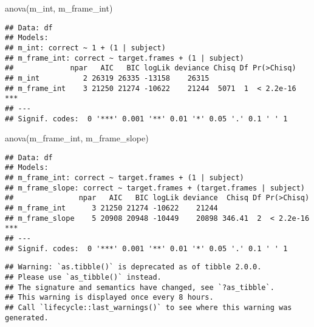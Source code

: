 \documentclass[
]{article}
\newenvironment{Shaded}{\begin{snugshade}}{\end{snugshade}}
\newcommand{\FunctionTok}[1]{\textcolor[rgb]{0.00,0.00,0.00}{#1}}
\newcommand{\NormalTok}[1]{#1}
\newcommand{\OtherTok}[1]{\textcolor[rgb]{0.56,0.35,0.01}{#1}}
\newcommand{\SpecialCharTok}[1]{\textcolor[rgb]{0.00,0.00,0.00}{#1}}
\newcommand{\StringTok}[1]{\textcolor[rgb]{0.31,0.60,0.02}{#1}}
\begin{document}
\begin{Shaded}
\begin{Highlighting}[]
\FunctionTok{anova}\NormalTok{(m\_int, m\_frame\_int)}
\end{Highlighting}
\end{Shaded}

\begin{verbatim}
## Data: df
## Models:
## m_int: correct ~ 1 + (1 | subject)
## m_frame_int: correct ~ target.frames + (1 | subject)
##             npar   AIC   BIC logLik deviance Chisq Df Pr(>Chisq)    
## m_int          2 26319 26335 -13158    26315                        
## m_frame_int    3 21250 21274 -10622    21244  5071  1  < 2.2e-16 ***
## ---
## Signif. codes:  0 '***' 0.001 '**' 0.01 '*' 0.05 '.' 0.1 ' ' 1
\end{verbatim}

\begin{Shaded}
\begin{Highlighting}[]
\FunctionTok{anova}\NormalTok{(m\_frame\_int, m\_frame\_slope)}
\end{Highlighting}
\end{Shaded}

\begin{verbatim}
## Data: df
## Models:
## m_frame_int: correct ~ target.frames + (1 | subject)
## m_frame_slope: correct ~ target.frames + (target.frames | subject)
##               npar   AIC   BIC logLik deviance  Chisq Df Pr(>Chisq)    
## m_frame_int      3 21250 21274 -10622    21244                         
## m_frame_slope    5 20908 20948 -10449    20898 346.41  2  < 2.2e-16 ***
## ---
## Signif. codes:  0 '***' 0.001 '**' 0.01 '*' 0.05 '.' 0.1 ' ' 1
\end{verbatim}

\begin{Shaded}
\end{Shaded}

\begin{verbatim}
## Warning: `as.tibble()` is deprecated as of tibble 2.0.0.
## Please use `as_tibble()` instead.
## The signature and semantics have changed, see `?as_tibble`.
## This warning is displayed once every 8 hours.
## Call `lifecycle::last_warnings()` to see where this warning was generated.
\end{verbatim}
\end{document}

